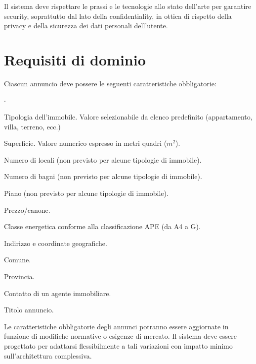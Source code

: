Il sistema deve rispettare le prassi e le tecnologie allo stato dell'arte per 
garantire security, soprattutto dal lato della confidentiality, in ottica di 
rispetto della privacy e della sicurezza dei dati personali dell'utente.

\section{Requisiti di dominio}
Ciascun annuncio deve possere le seguenti caratteristiche obbligatorie:
\begin{list}{$\cdot$}{}
    \item Tipologia dell'immobile. Valore selezionabile da elenco predefinito 
    (appartamento, villa, terreno, ecc.)
    \item Superficie. Valore numerico espresso in metri quadri ($m^2$).
    \item Numero di locali (non previsto per alcune tipologie di immobile).
    \item Numero di bagni (non previsto per alcune tipologie di immobile).
    \item Piano (non previsto per alcune tipologie di immobile).
    \item Prezzo/canone.
    \item Classe energetica conforme alla classificazione APE (da A4 a G).
    \item Indirizzo e coordinate geografiche.
    \item Comune.
    \item Provincia.
    \item Contatto di un agente immobiliare.
    \item Titolo annuncio.
\end{list}

Le caratteristiche obbligatorie degli annunci potranno essere aggiornate in 
funzione di modifiche normative o esigenze di mercato. Il sistema deve essere 
progettato per adattarsi flessibilmente a tali variazioni con impatto minimo 
sull'architettura complessiva.